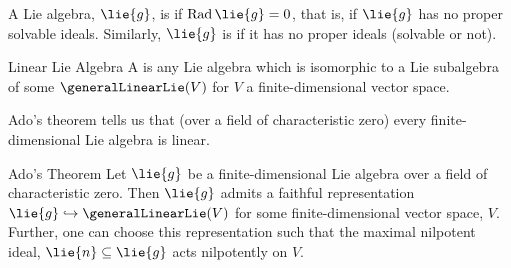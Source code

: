\documentclass[fleqn]{NotesClass}
\DeclareMathOperator{\Rad}{Rad}
\begin{document}
    \begin{dfn}{}{}
        A Lie algebra, \(\lie{g}\), is  if \(\Rad \lie{g} = 0\), that is, if \(\lie{g}\) has no proper solvable ideals.
        Similarly, \(\lie{g}\) is  if it has no proper ideals (solvable or not).
    \end{dfn}
    
    \begin{dfn}{Linear Lie Algebra}{}
        A  is any Lie algebra which is isomorphic to a Lie subalgebra of some \(\generalLinearLie(V)\) for \(V\) a finite-dimensional vector space.
    \end{dfn}
    
    Ado's theorem tells us that (over a field of characteristic zero) every finite-dimensional Lie algebra is linear.
    
    \begin{thm}{Ado's Theorem}{}
        Let \(\lie{g}\) be a finite-dimensional Lie algebra over a field of characteristic zero.
        Then \(\lie{g}\) admits a faithful representation \(\lie{g} \hookrightarrow \generalLinearLie(V)\) for some finite-dimensional vector space, \(V\).
        Further, one can choose this representation such that the maximal nilpotent ideal, \(\lie{n} \subseteq \lie{g}\) acts nilpotently on \(V\).
    \end{thm}
    
\end{document}
